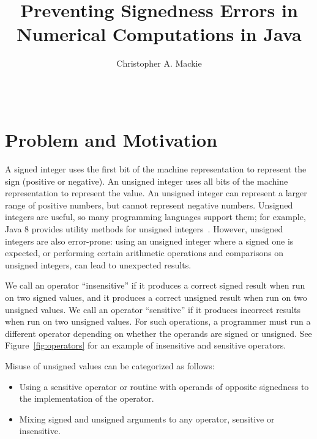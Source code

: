 \documentclass{sig-alternate-05-2015}
\begin{document}
\setlength{\pdfpageheight}{\paperheight}
\setlength{\pdfpagewidth}{\paperwidth}

\title{Preventing Signedness Errors in Numerical Computations in Java}

\author{
Christopher A. Mackie\\
       \\
       \\
}

\maketitle

\section{Problem and Motivation}

A signed integer uses the first bit of the machine representation to
represent the sign (positive or negative).  An unsigned integer uses all
bits of the machine representation to represent the value.
An unsigned integer can represent a larger range of positive numbers, but
cannot represent negative numbers.
Unsigned integers are useful, so many programming languages support them;
for example, Java 8 provides utility methods for unsigned
integers~\cite{JDK8UnsignedIntegerArithmetic2012}.  However, unsigned
integers are also error-prone:  using an unsigned integer where a signed
one is expected, or performing certain arithmetic operations and
comparisons on unsigned integers, can lead to unexpected results.

We call an operator ``insensitive'' if it produces a correct signed result
when run on two signed values, and it produces a correct unsigned result
when run on two unsigned values.  We call an operator ``sensitive'' if it
produces incorrect results when run on two unsigned values.  For such
operations, a programmer must run a different operator depending on whether
the operands are signed or unsigned.  See Figure~\ref{fig:operators} for
an example of insensitive and sensitive operators.

Misuse of unsigned values can be categorized as follows:

\begin{itemize}\itemsep 0pt \parskip 0pt
  \item Using a sensitive operator or routine with operands of opposite signedness to the implementation of the operator.
  \item Mixing signed and unsigned arguments to any operator, sensitive or insensitive.
\end{itemize}
\end{document}

